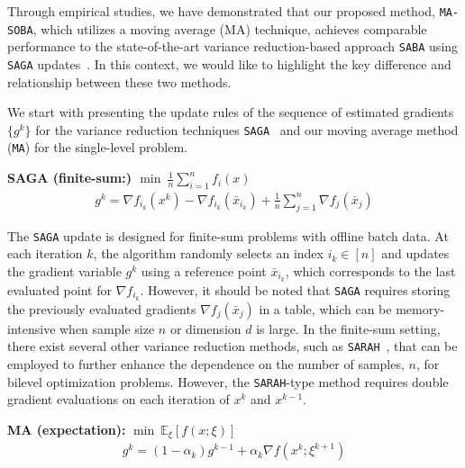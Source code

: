 \documentclass[10pt]{article}
\theoremstyle{remark}
\newcommand{\E}{\mathbb{E}}
\begin{document}
Through empirical studies, we have demonstrated that our proposed method, \texttt{MA-SOBA}, which utilizes a moving average (MA) technique, achieves comparable performance to the state-of-the-art variance reduction-based approach \texttt{SABA} using \texttt{SAGA} updates~\cite{defazio2014saga}. In this context, we would like to highlight the key difference and relationship between these two methods.

We start with presenting the update rules of the sequence of estimated gradients $\{g^k\}$ for the variance reduction techniques \texttt{SAGA}~\cite{defazio2014saga} and our moving average method (\texttt{MA}) for the single-level problem.
\begin{thmbox}
    \textbf{SAGA (finite-sum:) $\min~\frac{1}{n}\sum_{i=1}^{n} f_i(x)$}
    \begin{align*}
        g^k = \nabla f_{i_k}(x^k) - \nabla f_{i_k}(\bar{x}_{i_k}) + \frac{1}{n}\sum_{j=1}^{n}\nabla f_j(\bar{x}_j)
    \end{align*}
\end{thmbox}

The \texttt{SAGA} update is designed for finite-sum problems with offline batch data. At each iteration $k$, the algorithm randomly selects an index $i_k \in [n]$ and updates the gradient variable $g^k$ using a reference point $\bar{x}_{i_k}$, which corresponds to the last evaluated point for $\nabla f_{i_k}$. However, it should be noted that \texttt{SAGA} requires storing the previously evaluated gradients ${\nabla f_j(\bar{x}_j)}$ in a table, which can be memory-intensive when sample size $n$ or dimension $d$ is large. In the finite-sum setting, there exist several other variance reduction methods, such as \texttt{SARAH}~\cite{dagreou2023lower}, that can be employed to further enhance the dependence on the number of samples, $n$, for bilevel optimization problems. However, the \texttt{SARAH}-type method requires double gradient evaluations on each iteration of $x^k$ and $x^{k-1}$.


\begin{thmbox}
    \textbf{MA (expectation):} $\min~\E_{\xi}[f(x;\xi)]$
    \begin{align*}
        g^k = (1-\alpha_k) g^{k-1} + \alpha_k \nabla f(x^k; \xi^{k+1})
    \end{align*}
\end{thmbox}
\end{document}
